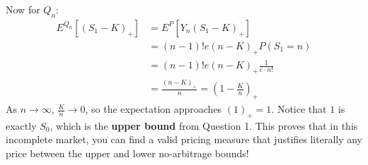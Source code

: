 Now for $Q_{n}$:
\begin{align}
    E^{Q_{n}}[(S_{1}-K)_{+}] &= E^{P}[Y_{n}(S_{1}-K)_{+}] \\
    &= (n-1)!e (n-K)_{+} P(S_{1}=n) \\
    &= (n-1)!e (n-K)_{+} \frac{1}{e \cdot n!} \\
    &= \frac{(n-K)_{+}}{n} = \left(1 - \frac{K}{n}\right)_{+}
\end{align}
As $n \to \infty$, $\frac{K}{n} \to 0$, so the expectation approaches $(1)_{+} = 1$.
Notice that $1$ is exactly $S_{0}$, which is the \textbf{upper bound} from Question 1.
This proves that in this incomplete market, you can find a valid pricing measure that justifies literally any price between the upper and lower no-arbitrage bounds!
